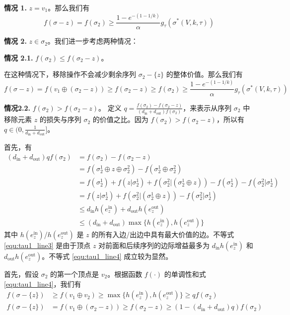 \textbf{情况 1.} $z=v_1$。那么我们有
\begin{equation}
f(\sigma -z ) = f(\sigma_2) \ge \frac{1-e^{-(1-1/k)}}{\alpha} g_\tau(\sigma^*(V,k,\tau))
\end{equation}

\textbf{情况 2.} $z\in \sigma_2$。我们进一步考虑两种情况：

\textbf{情况 2.1.} $f(\sigma_2) \le f(\sigma_2-z)$。

在这种情况下，移除操作不会减少剩余序列 $\sigma_2-\{z\}$ 的整体价值。那么我们有
\begin{equation}
    f(\sigma-z)  =f(v_1 \oplus (\sigma_2-z)) \ge f(\sigma_2-z)
     \ge f(\sigma_2) \ge \frac{1-e^{-(1-1/k)}}{\alpha} g_\tau(\sigma^*(V,k,\tau))
\end{equation}

\textbf{情况2.2.} $f(\sigma_2) > f(\sigma_2-z)$。
定义 $q= \frac{f(\sigma_2)-f(\sigma_2-z)}{(d_{\text{in}}+d_{\text{out}})f(\sigma_2)}$，来表示从序列 $\sigma_2$ 中移除元素 $z$ 的损失与序列 $\sigma_2$ 的价值之比。因为 $f(\sigma_2) > f(\sigma_2-z)$，所以有 $q\in (0,\frac{1}{d_{\text{in}}+d_{\text{out}}}]$。

首先，有
\begin{align}
    (d_{\text{in}} +  d_{\text{out}}) q f(\sigma_2)&= f(\sigma_2) - f(\sigma_2-z) \\
    & = f(\sigma_2^1 \oplus z \oplus \sigma_2^2) - f(\sigma_2^1 \oplus \sigma_2^2) \\
    & = f(\sigma_2^1) + f(z|\sigma_2^1)+f(\sigma_2^2| (\sigma_2^1\oplus z)) - f(\sigma_2^1) -f(\sigma_2^2|\sigma_2^1) \\
    & = f(z|\sigma_2^1)+f(\sigma_2^2| (\sigma_2^1\oplus z)) - f(\sigma_2^2|\sigma_2^1) \\
    & \le d_{\text{in}} h(e_z^{\text{in}}) + d_{\text{out}} h(e_z^{\text{out}}) \label{equ:tau1_line3}\\
    & \le (d_{\text{in}} + d_{\text{out}}) \max \{h(e_z^{\text{in}}),h(e_z^{\text{out}})\} \label{equ:tau1_line4}
\end{align}
\noindent 其中 $h(e_z^{\text{in}})$/$h(e_z^{\text{out}})$ 是 $z$ 的所有入边/出边中具有最大价值的边。不等式 \ref{equ:tau1_line3} 是由于顶点 $z$ 对前面和后续序列的边际增益最多为 $d_{\text{in}} h(e_z^{\text{in}})$ 和 $d_{\text{out}} h(e_z^{\text{out}})$。不等式 \ref{equ:tau1_line4} 成立较为显然。

首先，假设 $\sigma_2$ 的第一个顶点是 $v_2$。根据函数 $f(\cdot)$ 的单调性和式 \ref{equ:tau1_line4}，我们有
\begin{align}
    f(\sigma-\{z\}) & \ge f(v_1 \oplus v_2) \ge \max \{h(e_z^{\text{in}}),h(e_z^{\text{out}})\} \ge q f(\sigma_2) \\
    f(\sigma-\{z\}) & = f(v_1 \oplus (\sigma_2-z)) \ge f(\sigma_2 -z) \ge (1-(d_{\text{in}} + d_{\text{out}})q) f(\sigma_2)
\end{align}

